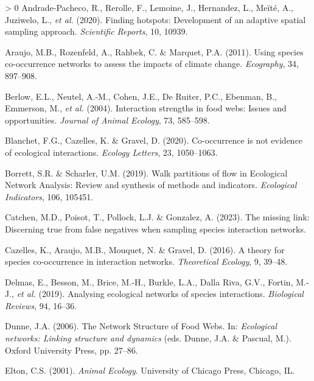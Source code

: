\documentclass[10pt,oneside]{article}
\newlength{\cslhangindent}
\newenvironment{CSLReferences}[3] %
 {%
  \setlength{\parindent}{0pt}
  \ifodd #1 \everypar{\setlength{\hangindent}{\cslhangindent}}\ignorespaces\fi
  \ifnum #2 > 0
  \setlength{\parskip}{#2\baselineskip}
  \fi
 }%
 {}
\begin{document}
\hypertarget{refs}{}
\begin{CSLReferences}{1}{0}
\leavevmode\hypertarget{ref-Andrade-Pacheco2020Finding}{}%
Andrade-Pacheco, R., Rerolle, F., Lemoine, J., Hernandez, L., Meïté, A.,
Juziwelo, L., \emph{et al.} (2020). Finding hotspots: Development of an
adaptive spatial sampling approach. \emph{Scientific Reports}, 10,
10939.

\leavevmode\hypertarget{ref-Araujo2011UsiSpe}{}%
Araujo, M.B., Rozenfeld, A., Rahbek, C. \& Marquet, P.A. (2011). Using
species co-occurrence networks to assess the impacts of climate change.
\emph{Ecography}, 34, 897--908.

\leavevmode\hypertarget{ref-Berlow2004IntStr}{}%
Berlow, E.L., Neutel, A.-M., Cohen, J.E., De Ruiter, P.C., Ebenman, B.,
Emmerson, M., \emph{et al.} (2004). Interaction strengths in food webs:
Issues and opportunities. \emph{Journal of Animal Ecology}, 73,
585--598.

\leavevmode\hypertarget{ref-Blanchet2020Cooccurrencea}{}%
Blanchet, F.G., Cazelles, K. \& Gravel, D. (2020). Co-occurrence is not
evidence of ecological interactions. \emph{Ecology Letters}, 23,
1050--1063.

\leavevmode\hypertarget{ref-Borrett2019WalPar}{}%
Borrett, S.R. \& Scharler, U.M. (2019). Walk partitions of flow in
Ecological Network Analysis: Review and synthesis of methods and
indicators. \emph{Ecological Indicators}, 106, 105451.

\leavevmode\hypertarget{ref-Catchen2023Missinga}{}%
Catchen, M.D., Poisot, T., Pollock, L.J. \& Gonzalez, A. (2023). The
missing link: Discerning true from false negatives when sampling species
interaction networks.

\leavevmode\hypertarget{ref-Cazelles2016Theorya}{}%
Cazelles, K., Araujo, M.B., Mouquet, N. \& Gravel, D. (2016). A theory
for species co-occurrence in interaction networks. \emph{Theoretical
Ecology}, 9, 39--48.

\leavevmode\hypertarget{ref-Delmas2019AnaEco}{}%
Delmas, E., Besson, M., Brice, M.-H., Burkle, L.A., Dalla Riva, G.V.,
Fortin, M.-J., \emph{et al.} (2019). Analysing ecological networks of
species interactions. \emph{Biological Reviews}, 94, 16--36.

\leavevmode\hypertarget{ref-Dunne2006Network}{}%
Dunne, J.A. (2006). The Network Structure of Food Webs. In:
\emph{Ecological networks: Linking structure and dynamics} (eds. Dunne,
J.A. \& Pascual, M.). Oxford University Press, pp. 27--86.

\leavevmode\hypertarget{ref-Elton2001AniEco}{}%
Elton, C.S. (2001). \emph{Animal Ecology}. University of Chicago Press,
Chicago, IL.


\end{CSLReferences}
\end{document}
